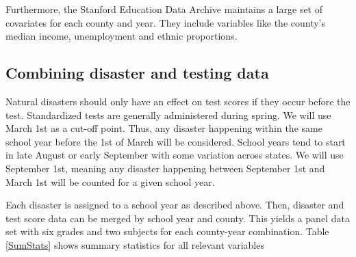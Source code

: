 Furthermore, the Stanford Education Data Archive maintains a large set of covariates for each county and year. They include variables like the county's median income, unemployment and ethnic proportions.


\subsection{Combining disaster and testing data}

Natural disasters should only have an effect on test scores if they occur before the test. Standardized tests are generally administered during spring. We will use March 1st as a cut-off point. Thus, any disaster happening within the same school year before the 1st of March will be considered. School years tend to start in late August or early September with some variation across states. We will use September 1st, meaning any disaster happening between September 1st and March 1st will be counted for a given school year.

Each disaster is assigned to a school year as described above. Then, disaster and test score data can be merged by school year and county. This yields a panel data set with six grades and two subjects for each county-year combination. Table \ref{SumStats} shows summary statistics for all relevant variables










